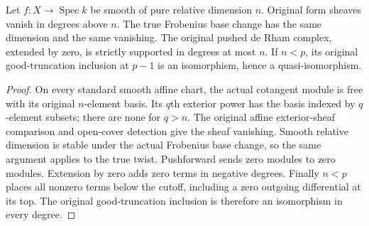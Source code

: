 \begin{lemma}
\label{lem:di-reused-native-dimension-support}
\leanok
Let $f:X\to\operatorname{Spec}k$ be smooth of pure relative dimension
$n$. Original form sheaves vanish in degrees above $n$. The true
Frobenius base change has the same dimension and the same vanishing.
The original pushed de Rham complex, extended by zero, is strictly
supported in degrees at most $n$. If $n<p$, its original good-truncation
inclusion at $p-1$ is an isomorphism, hence a quasi-isomorphism.
\end{lemma}
\begin{proof}
\leanok
On every standard smooth affine chart, the actual cotangent module is
free with its original $n$-element basis. Its $q$th exterior power has
the basis indexed by $q$-element subsets; there are none for $q>n$.
The original affine exterior-sheaf comparison and open-cover detection
give the sheaf vanishing. Smooth relative dimension is stable under
the actual Frobenius base change, so the same argument applies to the
true twist. Pushforward sends zero modules to zero modules. Extension
by zero adds zero terms in negative degrees. Finally $n<p$ places all
nonzero terms below the cutoff, including a zero outgoing differential
at its top. The original good-truncation inclusion is therefore an
isomorphism in every degree.
\end{proof}

